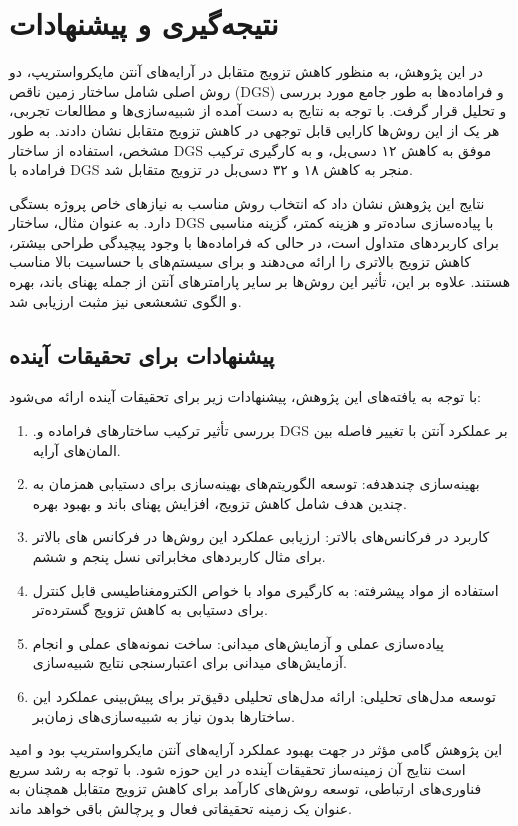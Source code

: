 \newpage
\chapter{
نتیجه‌گیری و  پیشنهادات
}

در این پژوهش، به منظور کاهش تزویج متقابل در آرایه‌های آنتن مایکرواستریپ، دو روش اصلی شامل ساختار زمین ناقص (DGS) و فراماده‌ها به طور جامع مورد بررسی و تحلیل قرار گرفت. با توجه به نتایج به دست آمده از شبیه‌سازی‌ها و مطالعات تجربی، هر یک از این روش‌ها کارایی قابل توجهی در کاهش تزویج متقابل نشان دادند. به طور مشخص، استفاده از ساختار DGS موفق به کاهش ۱۲ دسی‌بل، و به کارگیری ترکیب فراماده‌ با DGS منجر به کاهش ۱۸ و ۳۲ دسی‌بل در تزویج متقابل شد.

نتایج این پژوهش نشان داد که انتخاب روش مناسب به نیازهای خاص پروژه بستگی دارد. به عنوان مثال، ساختار DGS با پیاده‌سازی ساده‌تر و هزینه کمتر، گزینه مناسبی برای کاربردهای متداول است، در حالی که فراماده‌ها با وجود پیچیدگی طراحی بیشتر، کاهش تزویج بالاتری را ارائه می‌دهند و برای سیستم‌های با حساسیت بالا مناسب هستند. علاوه بر این، تأثیر این روش‌ها بر سایر پارامترهای آنتن از جمله پهنای باند، بهره و الگوی تشعشعی نیز مثبت ارزیابی شد.


\section{
	پیشنهادات برای تحقیقات آینده
}

با توجه به یافته‌های این پژوهش، پیشنهادات زیر برای تحقیقات آینده ارائه می‌شود:
\begin{enumerate}
	\item {
	.بررسی تأثیر ترکیب ساختارهای فراماده و DGS بر عملکرد آنتن با تغییر فاصله بین المان‌های آرایه.
	}
	\item {
	بهینه‌سازی چندهدفه: توسعه الگوریتم‌های بهینه‌سازی برای دستیابی همزمان به چندین هدف شامل کاهش تزویج، افزایش پهنای باند و بهبود بهره.
	}
	\item {
	 کاربرد در فرکانس‌های بالاتر: ارزیابی عملکرد این روش‌ها در فرکانس های بالاتر برای مثال کاربردهای مخابراتی نسل پنجم و ششم.
	}
	\item {
	استفاده از مواد پیشرفته: به کارگیری مواد با خواص الکترومغناطیسی قابل کنترل برای دستیابی به کاهش تزویج گسترده‌تر.
	}
	\item {
	پیاده‌سازی عملی و آزمایش‌های میدانی: ساخت نمونه‌های عملی و انجام آزمایش‌های میدانی برای اعتبارسنجی نتایج شبیه‌سازی.
	}
	\item {
	 توسعه مدل‌های تحلیلی: ارائه مدل‌های تحلیلی دقیق‌تر برای پیش‌بینی عملکرد این ساختارها بدون نیاز به شبیه‌سازی‌های زمان‌بر.
	}
\end{enumerate}

این پژوهش گامی مؤثر در جهت بهبود عملکرد آرایه‌های آنتن مایکرواستریپ بود و امید است نتایج آن زمینه‌ساز تحقیقات آینده در این حوزه شود. با توجه به رشد سریع فناوری‌های ارتباطی، توسعه روش‌های کارآمد برای کاهش تزویج متقابل همچنان به عنوان یک زمینه تحقیقاتی فعال و پرچالش باقی خواهد ماند.

